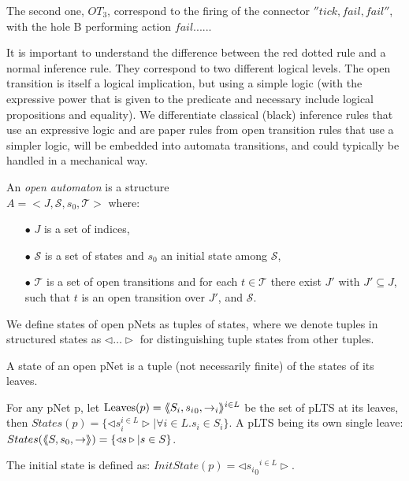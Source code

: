 \documentclass{llncs}
\begin{document}
The second one, $OT_3$, correspond to the firing of the connector
$''tick, fail, fail''$, with the hole B performing action $fail$......

It is important to understand the difference between the red dotted rule and a normal 
inference rule. They correspond to two different logical levels.
 The open transition is itself a logical implication, but using a simple logic (with the 
 expressive power that is given to the predicate and necessary include logical 
 propositions and equality). We differentiate classical (black) inference rules that use 
 an expressive logic and are paper rules from open transition rules that use a simpler 
 logic, 
 will be embedded into automata transitions, and could typically be handled in a 
 mechanical way.


\begin{definition}
	\label{defn:open-automaton}
	An \emph{open automaton} is a structure\\ $A =
	<J,\mathcal{S},s_0,\mathcal{T}>$ where:
	\begin{itemize}
		\item[$\bullet$]   $J$ is a  set of indices,
		\item[$\bullet$]   $\mathcal{S}$ is a set of states and $s_0$ an initial state
		among $\mathcal{S}$,
		\item[$\bullet$] $\mathcal{T}$ is a set of open transitions and for each
		$t\in \mathcal{T}$ there exist  $J'$ with  $J'
		\subseteq J$, such that $t$ is an open transition over  $J'$,
		and  $\mathcal{S}$.
		
	\end{itemize}
\end{definition}
	

%

We define states of open pNets as tuples of states, where we denote tuples
in structured states as $\triangleleft\ldots\triangleright$ for distinguishing tuple 
states from other tuples.
\begin{definition}\label{def-states}
  A state of an open pNet is a tuple (not necessarily finite) of the
  states of its leaves.

  For any pNet p, let $\operatorname{Leaves}(p) = \langle\hspace{-0.58ex}\langle S_i,{s_i}_0, \to_i\rangle\hspace{-0.58ex}\rangle^{i \in L}$ be 
  the set of pLTS at its leaves,
  then $States(p) = \{\triangleleft s_i^{i\in L}
  \triangleright| \forall i\in L. s_i \in S_i\}$.
A pLTS being its own single leave:
  $States(\langle\hspace{-0.58ex}\langle S,s_0, \to\rangle\hspace{-0.58ex}\rangle) = \{\triangleleft s \triangleright| s \in S\}$.

The initial state is defined as:
$InitState(p) = \triangleleft {{s_i}_0}^{i\in L}  \triangleright$.
\end{definition}
\end{document}
